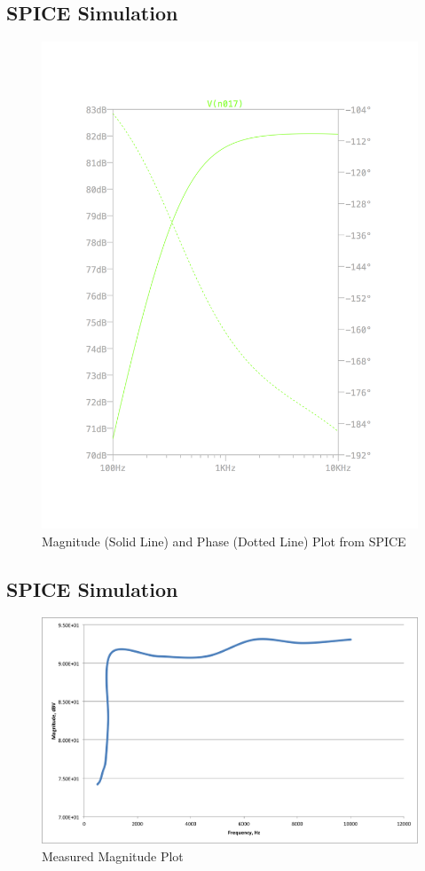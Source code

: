 \documentclass[11pt, twoside, letterpaper]{article}
\begin{document}
\subsection{SPICE Simulation}
\begin{figure}[htbp]
\begin{center}
\includegraphics[width=5in]{MagPlot.png}
\caption{Magnitude (Solid Line) and Phase (Dotted Line) Plot from SPICE}
\end{center}
\end{figure}
\FloatBarrier

\subsection{SPICE Simulation}
\begin{figure}
\begin{center}
\includegraphics[width=7in]{measuredmag.png}
\caption{Measured Magnitude Plot}
\end{center}
\end{figure}
\end{document}
